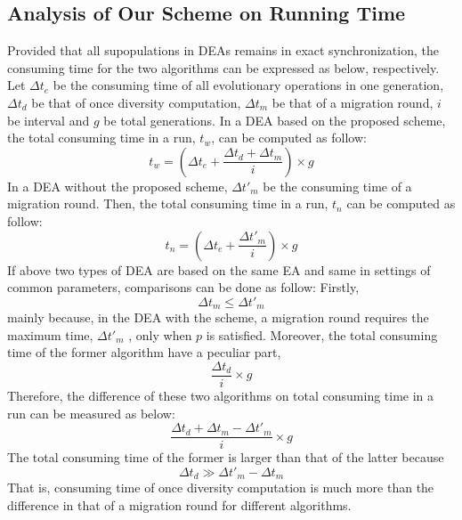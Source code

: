 \documentclass[journal,onecolumn]{IEEEtran}
\begin{document}
\subsection{Analysis of Our Scheme on Running Time}
Provided that all supopulations in DEAs remains in exact synchronization, the consuming time for the two algorithms can be expressed as below, respectively.
Let $\Delta t_e$ be the consuming time of all evolutionary operations in one generation, $\Delta t_d$ be that of once diversity computation, $\Delta t_m$ be that of a migration round, $i$ be interval and $g$ be total generations. In a DEA based on the proposed scheme, the total consuming time in a run, $t_w$, can be computed as follow:
\begin{equation}
  t_w = (\Delta t_e + \frac{\Delta t_d + \Delta t_m} {i} ) \times g
\end{equation}
In a DEA without the proposed scheme, $\Delta t'_m$ be the consuming time of a migration round.
Then, the total consuming time in a run, $t_n$ can be computed as follow:
\begin{equation}
 t_n = (\Delta t_e + \frac{\Delta t'_m} {i} ) \times g
\end{equation}
If above two types of DEA are based on the same EA and same in settings of common parameters, comparisons can be done as follow: Firstly,
\begin{equation}
 \Delta t_m \le \Delta t'_m
\end{equation}
mainly because, in the DEA with the scheme, a migration round requires the maximum time, $\Delta t'_m$ , only when $p$ is satisfied.
Moreover, the total consuming time of the former algorithm have a peculiar part,
\begin{equation}
 \frac {\Delta t_d} {i} \times g
\end{equation}
Therefore, the difference of these two algorithms on total consuming time in a run can be measured as below:
\begin{equation}
 \frac {\Delta t_d + \Delta t_m - \Delta t'_m} {i} \times g
\end{equation}
The total consuming time of the former is larger than that of the latter because
\begin{equation}
 \Delta t_d \gg \Delta t'_m - \Delta t_m
\end{equation}
That is, consuming time of once diversity computation is much more than the difference in that of a migration round for different algorithms.
\end{document}
